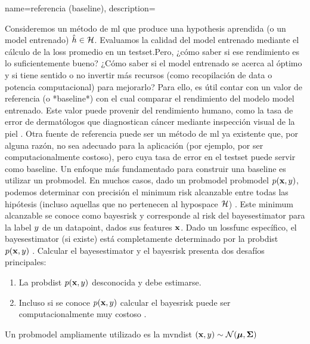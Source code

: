 {{
{name={referencia (baseline)},
    description={Consideremos un método de \gls{ml} que produce una 
    \gls{hypothesis} aprendida (o un \gls{model} entrenado) $\hat{h} \in \mathcal{H}$.
	Evaluamos la calidad del \gls{model} entrenado  
	mediante el cálculo de la \gls{loss} promedio en un \gls{testset}.Pero, ¿cómo saber si ese rendimiento es lo suficientemente bueno?
	¿Cómo saber si el \gls{model} entrenado se acerca al óptimo y si tiene sentido o no invertir más recursos (como recopilación de \gls{data} o potencia computacional) para mejorarlo? 
    Para ello, es útil contar con un valor de referencia (o *baseline*) con el cual comparar el rendimiento  
    del modelo \gls{model} entrenado. Este valor puede provenir del rendimiento humano,
    como la tasa de error de dermatólogos que diagnostican cáncer mediante inspección visual de la piel \cite{SkinHumanAI}.
	Otra fuente de referencia puede ser un método de \gls{ml} ya existente que, por alguna razón, no sea adecuado para la aplicación (por ejemplo, por ser computacionalmente costoso), pero cuya tasa de error en el \gls{testset} puede servir como baseline.
	Un enfoque más fundamentado para construir una baseline es utilizar un \gls{probmodel}. En muchos casos, dado un \gls{probmodel} \gls{probmodel} $p({\bf x},y)$,  
    podemos determinar con precisión el \gls{minimum} \gls{risk} alcanzable entre todas las hipótesis (incluso aquellas que no pertenecen al \gls{hypospace} $\mathcal{H}$) \cite{LC}. 
    Este \gls{minimum} alcanzable se conoce como \gls{bayesrisk} y corresponde al \gls{risk} del \gls{bayesestimator} para la \gls{label} $y$ de un \gls{datapoint}, dados sus \gls{feature}s ${\bf x}$.
	Dado un \gls{lossfunc} específico, el \gls{bayesestimator} (si existe) está completamente determinado por la \gls{probdist} $p({\bf x},y)$ \cite[Cap. 4]{LC}. 
    Calcular el \gls{bayesestimator} y el \gls{bayesrisk} presenta dos desafíos principales:
    \begin{enumerate}[[label=\arabic*)]
    	\item La \gls{probdist} $p({\bf x},y)$ desconocida y debe estimarse.
    	\item Incluso si se conoce $p({\bf x},y)$ calcular el 
		\gls{bayesrisk} puede ser computacionalmente muy costoso \cite{cooper1990computational}.
	\end{enumerate}
	Un \gls{probmodel} ampliamente utilizado es la \gls{mvndist} $\left( {\bf x},y \right) \sim \mathcal{N}({\bm \mu},{\bm \Sigma})$ 
}}}}
